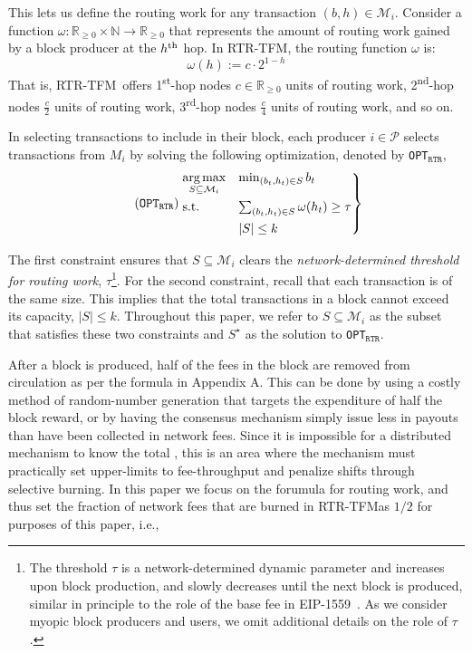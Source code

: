 \documentclass[sigconf,anonymous]{aamas}
\newcommand{\ourTFM}{\textsc{RTR-TFM}}
\newcommand{\ourOPT}{\texttt{OPT$_{\texttt{RTR}}$}}
\begin{document}
This lets us define the routing work for any transaction $(b,h) \in \mathcal{M}_i$. Consider a function $\omega:\mathbb{R}_{\geq 0}\times\mathbb{N}\rightarrow\mathbb{R}_{\geq 0}$ that represents the amount of routing work gained by a block producer at the $h\textsuperscript{th}$ hop. In \ourTFM, the routing function $\omega$ is:
\begin{equation}
    \omega(h) := c\cdot2^{1 - h}
\end{equation}
That is, \ourTFM\ offers 1\textsuperscript{st}-hop nodes $c\in \mathbb{R}_{\geq 0}$ units of routing work, 2\textsuperscript{nd}-hop nodes $\frac{c}{2}$ units of routing work, 3\textsuperscript{rd}-hop nodes $\frac{c}{4}$ units of routing work, and so on.

In selecting transactions to include in their block, each producer $i\in \mathcal{P}$ selects transactions from $M_i$ by solving the following optimization, denoted by \ourOPT,
\begin{align}\tag{\ourOPT}
    \begin{rcases}
        \underset{S\subseteq \mathcal{M}_i}{\mbox{arg}\max} & \min_{(b_t,h_t)\in S}  b_t \\
       \mbox{{s.t.}}\  & \sum_{(b_t,h_t)\in S} \omega(h_t) \geq \tau \\
       & |S| \leq k\\
   \end{rcases}
\end{align}

The first constraint ensures that $S\subseteq \mathcal{M}_i$ clears the \textit{network-determined threshold for routing work}, $\tau$\footnote{The threshold $\tau$ is a network-determined dynamic parameter and increases upon block production, and slowly decreases until the next block is produced, similar in principle to the role of the base fee in EIP-1559~\cite{buterin2019eip}. As we consider myopic block producers and users, we omit additional details on the role of $\tau$.}. For the second constraint, recall that each transaction is of the same size. This implies that the total transactions in a block cannot exceed its capacity, $|S| \leq k$. Throughout this paper, we refer to $S\subseteq \mathcal{M}_i$ as the subset that satisfies these two constraints and $S^\star$ as the solution to \ourOPT.

After a block is produced, half of the fees in the block are removed from circulation as per the formula in Appendix A. This can be done by using a costly method of random-number generation that targets the expenditure of half the block reward, or by having the consensus mechanism simply issue less in payouts than have been collected in network fees. Since it is impossible for a distributed mechanism to know the total , this is an area where the mechanism must practically set upper-limits to fee-throughput and penalize shifts through selective burning. In this paper we focus on the forumula for routing work, and thus set the fraction of network fees that are burned in \ourTFM as $1/2$ for purposes of this paper, i.e.,
\end{document}
